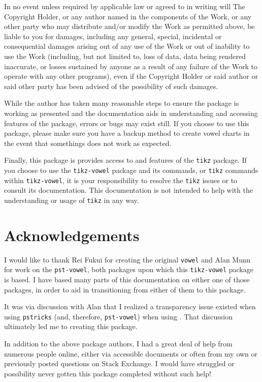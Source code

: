 \documentclass{article}
\newcommand{\ignore}[1]{}
\newcommand{\pkg}[1]{\texttt{#1}}
\begin{document}
In no event unless required by applicable law or agreed to in writing will The Copyright Holder, or any author named in the components of the Work, or any other party who may distribute and/or modify the Work as permitted above, be liable to you for damages, including any general, special, incidental or consequential damages arising out of any use of the Work or out of inability to use the Work (including, but not limited to, loss of data, data being rendered inaccurate, or losses sustained by anyone as a result of any failure of the Work to operate with any other programs), even if the Copyright Holder or said author or said other party has been advised of the possibility of such damages.

While the author has taken many reasonable steps to ensure the package is working as presented and the documentation aids in understanding and accessing features of the package, errors or bugs may exist still.  If you choose to use this package, please make sure you have a backup method to create vowel charts in the event that somethings does not work as expected.

Finally, this package is provides access to and features of the \pkg{tikz} package.  If you choose to use the \pkg{tikz-vowel} package and its commands, or \pkg{tikz} commands within \pkg{tikz-vowel}, it is your responsibility to resolve the \pkg{tikz} issues or to consult its documentation.  This documentation is not intended to help with the understanding or usage of \pkg{tikz} in any way.


\section{Acknowledgements}
\label{sec:Acknowledgements}
I would like to thank Rei Fukui for creating the original \pkg{vowel} and Alan Munn for work on the \pkg{pst-vowel}, both packages upon which this \pkg{tikz-vowel} package is based.  I have based many parts of this documentation on either one of those packages, in order to aid in transitioning from either of them to this package.

It was via discussion with Alan that I realized a transparency issue existed when using \pkg{pstricks} (and, therefore, \pkg{pst-vowel}) when using \XeLaTeX.  That discussion ultimately led me to creating this package.

In addition to the above package authors, I had a great deal of help from numerous people online, either via accessible documents or often from my own or previously posted questions on Stack Exchange.  I would have struggled or possibility never gotten this package completed without such help!



\ignore{
			\cardinalvowel{i}{1}
			\cardinalvowel{e}{2}
    			\cardinalvowel{ɛ}{3}
    			\cardinalvowel{a}{4}
    			\cardinalvowel{ɑ}{5}
    			\cardinalvowel{ɔ}{6}
    			\cardinalvowel{o}{7}
    			\cardinalvowel{u}{8}
    			\cardinalvowel{ɨ}{9}
    			\cardinalvowel{ɘ}{10}
   			\cardinalvowel{ə}{11}
   			\cardinalvowel{ɜ}{12}
    			\cardinalvowel{ɪ}{13}
    			\cardinalvowel{ʊ}{14}
    			\cardinalvowel{ɐ}{15}
    			\cardinalvowel{æ}{16}
}%
\end{document}

